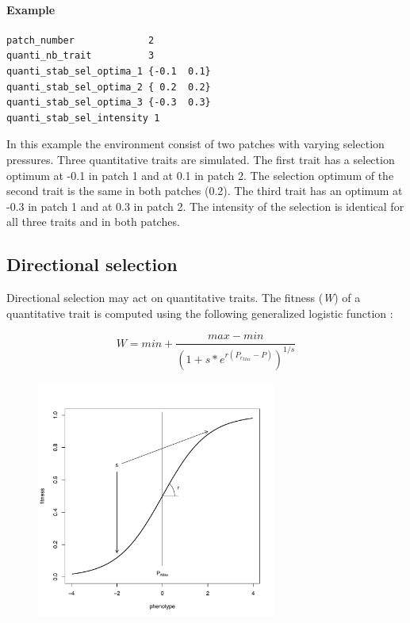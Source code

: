 \documentclass[letterpaper,12pt,oneside]{book}
\begin{document}
\paragraph{Example}\hspace*{\fill}
\begin{lstlisting}[frame=single]
patch_number             2
quanti_nb_trait          3
quanti_stab_sel_optima_1 {-0.1  0.1}                            
quanti_stab_sel_optima_2 { 0.2  0.2}
quanti_stab_sel_optima_3 {-0.3  0.3}    
quanti_stab_sel_intensity 1                                                    
\end{lstlisting}
In this example the environment consist of two patches with varying selection pressures. Three quantitative traits are simulated. The first trait has a selection optimum at -0.1 in patch 1 and at 0.1 in patch 2. The selection optimum of the second trait is the same in both patches (0.2). The third trait has an optimum at -0.3 in patch 1 and at 0.3 in patch 2. The intensity of the selection is identical for all three traits and in both patches.    

\subsection{Directional selection}\label{sub:DirectionalSelection}
Directional selection may act on quantitative traits. The fitness (\textit{W}) of a quantitative trait is computed using the following generalized logistic function \citep{Richards_1959}: 

        \[ W = min + \frac{max-min}{(1+s*e^{r(P_{r_{Max}}-P)})^{1/s}} \] 

\begin{figure}[h]
    \centering
        \includegraphics[width=0.70\textwidth]{directional-selection.pdf}
    \label{fig:directional-selection}
\end{figure}
\end{document}
